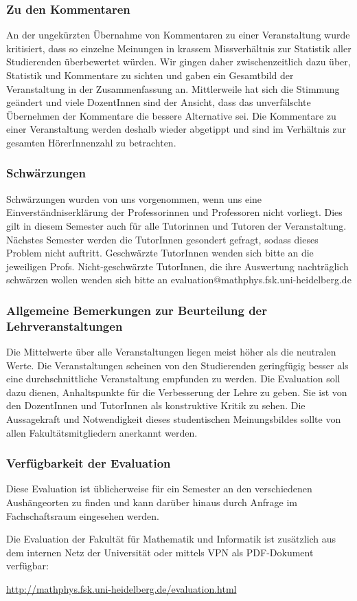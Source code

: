 \subsubsection{Zu den Kommentaren}

An der ungekürzten Übernahme von Kommentaren zu einer Veranstaltung wurde kritisiert, dass so einzelne Meinungen in krassem Missverhältnis zur Statistik aller Studierenden überbewertet würden. Wir gingen daher zwischenzeitlich dazu über, Statistik und Kommentare zu sichten und gaben ein Gesamtbild der Veranstaltung in der Zusammenfassung an. Mittlerweile hat sich die Stimmung geändert und viele DozentInnen sind der Ansicht, dass das unverfälschte Übernehmen der Kommentare die bessere Alternative sei. Die Kommentare zu einer Veranstaltung werden deshalb wieder abgetippt und sind im Verhältnis zur gesamten HörerInnenzahl zu betrachten.

\subsubsection{Schwärzungen}
Schwärzungen wurden von uns vorgenommen, wenn uns eine Einverständniserklärung der Professorinnen und Professoren nicht vorliegt. Dies gilt in diesem Semester auch für alle Tutorinnen und Tutoren der Veranstaltung. Nächstes Semester werden die TutorInnen gesondert gefragt, sodass dieses Problem nicht auftritt. Geschwärzte TutorInnen wenden sich bitte an die jeweiligen Profs. Nicht-geschwärzte TutorInnen, die ihre Auswertung nachträglich schwärzen wollen wenden sich bitte an evaluation@mathphys.fsk.uni-heidelberg.de


\subsubsection{Allgemeine Bemerkungen zur Beurteilung der Lehrveranstaltungen}

Die Mittelwerte über alle Veranstaltungen liegen meist höher als die neutralen Werte. Die Veranstaltungen scheinen von den Studierenden geringfügig besser als eine durchschnittliche Veranstaltung empfunden zu werden. Die Evaluation soll dazu dienen, Anhaltspunkte für die Verbesserung der Lehre zu geben. Sie ist von den DozentInnen und TutorInnen als konstruktive Kritik zu sehen. Die Aussagekraft und Notwendigkeit dieses studentischen Meinungsbildes sollte von allen Fakultätsmitgliedern anerkannt werden.

\subsubsection{Verfügbarkeit der Evaluation}

Diese Evaluation ist üblicherweise für ein Semester an den verschiedenen Aushängeorten zu finden und kann darüber hinaus durch Anfrage im Fachschaftsraum eingesehen werden.

Die Evaluation der Fakultät für Mathematik und Informatik ist zusätzlich aus dem internen Netz der Universität oder mittels VPN als PDF-Dokument verfügbar:

\url{http://mathphys.fsk.uni-heidelberg.de/evaluation.html}
